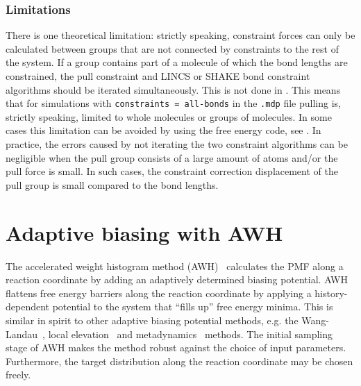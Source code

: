 \subsubsection{Limitations}
There is one theoretical limitation:
strictly speaking, constraint forces can only be calculated between
groups that are not connected by constraints to the rest of the system.
If a group contains part of a molecule of which the bond lengths
are constrained, the pull constraint and LINCS or SHAKE bond constraint
algorithms should be iterated simultaneously. This is not done in {\gromacs}.
This means that for simulations with {\tt constraints = all-bonds}
in the {\tt .mdp} file pulling is, strictly speaking,
limited to whole molecules or groups of molecules.
In some cases this limitation can be avoided by using the free energy code,
see .
In practice, the errors caused by not iterating the two constraint
algorithms can be negligible when the pull group consists of a large
amount of atoms and/or the pull force is small.
In such cases, the constraint correction displacement of the pull group
is small compared to the bond lengths.


\section{Adaptive biasing with AWH}
\label{sec:awh}
The accelerated weight histogram method (AWH)~\cite{lindahl2014accelerated} 
calculates the PMF along a reaction coordinate by adding an adaptively determined biasing potential.
AWH  flattens free energy barriers along the reaction coordinate by applying a history-dependent potential to the system
that ``fills up'' free energy minima. 
This is similar in spirit to other adaptive biasing potential methods,
e.g. the Wang-Landau~\cite{wang2001efficient}, local elevation~\cite{huber1994local} and metadynamics~\cite{laio2002escaping} methods.
The initial sampling stage of AWH makes the method robust against the choice of input parameters.
Furthermore, the target distribution along the reaction coordinate may be chosen freely.

